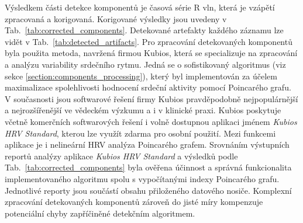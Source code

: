 Výsledkem části detekce komponentů je časová série R vln, která je vzápětí
zpracovaná a korigovaná. Korigované výsledky jsou uvedeny v
Tab.~\ref{tab:corrected_components}. Detekované artefakty každého záznamu lze
vidět v Tab.~\ref{tab:detected_artifacts}. Pro zpracování detekovaných
komponentů byla použita metoda, navržená firmou Kubios, která se specializuje na
zpracování a analýzu variability srdečního rytmu. Jedná se o sofistikovaný
algoritmus (viz sekce \ref{section:components_processing}), který byl
implementován za účelem maximalizace spolehlivosti hodnocení srdeční aktivity
pomocí Poincarého grafu. V současnosti jsou softwarové řešení firmy Kubios
pravděpodobně nejpopulárnější a nejrozšířenější ve vědeckém výzkumu a i v
klinické praxi. Kubios poskytuje včetně komerčních softwarových řešení i volně
dostupnou aplikaci jménem \textit{Kubios HRV Standard}, kterou lze využít zdarma
pro osobní použití. Mezi funkcemi aplikace je i nelineární HRV analýza
Poincarého grafem. Srovnáním výstupních reportů analýzy aplikace \textit{Kubios
HRV Standard} a výsledků podle Tab.~\ref{tab:corrected_components} byla ověřena
účinnost a správná funkcionalita implementovaného algoritmu spolu s vypočítanými
indexy Poincarého grafu. Jednotlivé reporty jsou součástí obsahu přiloženého
datového nosiče. Komplexní zpracování detekovaných komponentů zároveň do jisté
míry kompenzuje potenciální chyby zapříčiněné detekčním algoritmem.











